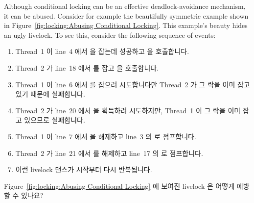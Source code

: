 Although conditional locking can be an effective deadlock-avoidance
mechanism, it can be abused.
Consider for example the beautifully symmetric example shown in
Figure~\ref{fig:locking:Abusing Conditional Locking}.
This example's beauty hides an ugly livelock.
To see this, consider the following sequence of events:
\fi

\begin{enumerate}
\item	Thread~1 이 line~4 에서  을 잡는데 성공하고
	 을 호출합니다.
\item	Thread~2 가 line~18 에서  를 잡고  을
	호출합니다.
\item	Thread~1 이 line~6 에서  를 잡으려 시도합니다만 Thread~2 가
	그 락을 이미 잡고 있기 때문에 실패합니다.
\item	Thread~2 가 line~20 에서  을 획득하려 시도하지만, Thread~1 이
	그 락을 이미 잡고 있으므로 실패합니다.
\item	Thread~1 이 line~7 에서  을 해제하고 line~3 의  로
	점프합니다.
\item	Thread~2 가 line~21 에서  를 해제하고 line~17 의 
	로 점프합니다.
\item	이런 livelock 댄스가 시작부터 다시 반복됩니다.

\end{enumerate}

\QuickQuiz{}
	Figure~\ref{fig:locking:Abusing Conditional Locking} 에 보여진 livelock
	은 어떻게 예방할 수 있나요?
	\iffalse

